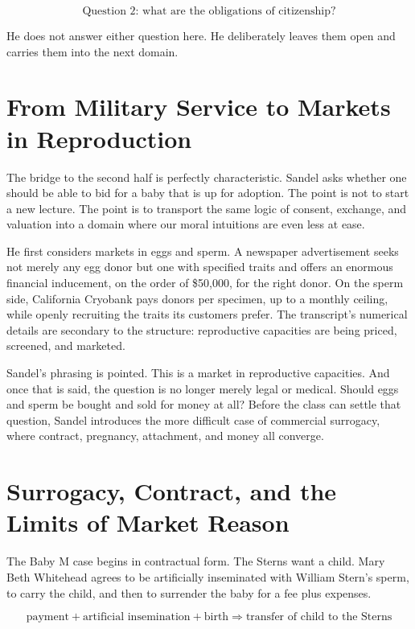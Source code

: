 \begin{equation}
\text{Question 2: what are the obligations of citizenship?}
\end{equation}

He does not answer either question here. He deliberately leaves them open and carries them into the next domain.

\section{From Military Service to Markets in Reproduction}

The bridge to the second half is perfectly characteristic. Sandel asks whether one should be able to bid for a baby that is up for adoption. The point is not to start a new lecture. The point is to transport the same logic of consent, exchange, and valuation into a domain where our moral intuitions are even less at ease.

He first considers markets in eggs and sperm. A newspaper advertisement seeks not merely any egg donor but one with specified traits and offers an enormous financial inducement, on the order of \$50{,}000, for the right donor. On the sperm side, California Cryobank pays donors per specimen, up to a monthly ceiling, while openly recruiting the traits its customers prefer. The transcript's numerical details are secondary to the structure: reproductive capacities are being priced, screened, and marketed.

Sandel's phrasing is pointed. This is a market in reproductive capacities. And once that is said, the question is no longer merely legal or medical. Should eggs and sperm be bought and sold for money at all? Before the class can settle that question, Sandel introduces the more difficult case of commercial surrogacy, where contract, pregnancy, attachment, and money all converge.

\section{Surrogacy, Contract, and the Limits of Market Reason}

The Baby M case begins in contractual form. The Sterns want a child. Mary Beth Whitehead agrees to be artificially inseminated with William Stern's sperm, to carry the child, and then to surrender the baby for a fee plus expenses.

\begin{equation}
\text{payment} + \text{artificial insemination} + \text{birth} \Longrightarrow \text{transfer of child to the Sterns}
\end{equation}

